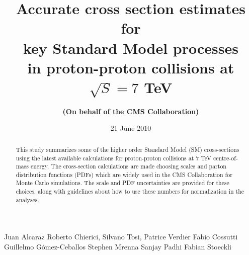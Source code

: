 \documentclass{cmspaper_pdf}
\begin{document}

\begin{titlepage}

  \date{21 June 2010}

  \title{Accurate cross section estimates for \\ key Standard Model 
         processes \\ in proton-proton collisions at $\sqrt{S}=7$ TeV}

  \begin{Authlist}
     Juan Alcaraz
     Roberto Chierici, Silvano Tosi, Patrice Verdier
    Fabio Cossutti 
    Guillelmo G\'omez-Ceballos 
    Stephen Mrenna 
    Sanjay Padhi
    Fabian Stoeckli

  \end{Authlist}

  \author{\bf(On behalf of the CMS Collaboration)}

  \begin{abstract}
This study summarizes some of the higher order Standard Model (SM) cross-sections using the latest 
available calculations for proton-proton collisions at 7 TeV centre-of-mass 
energy. The cross-section calculations are made choosing scales and 
parton distribution functions (PDFs) which are widely used in the CMS Collaboration for Monte 
Carlo simulations. The scale and PDF uncertainties are provided 
for these choices, along with guidelines about how to use these numbers for normalization
in the analyses. 
  \end{abstract}

\end{titlepage}

\setcounter{page}{2}%

%





 
\end{document}
